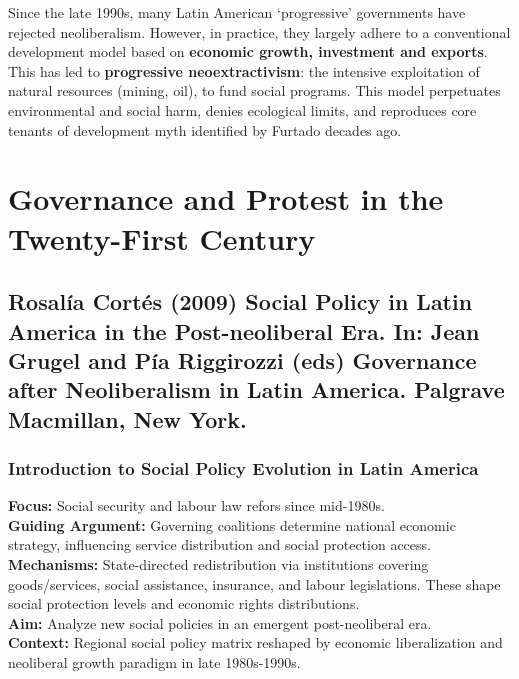 \documentclass{article}
\begin{document}
    \noindent Since the late 1990s, many Latin American `progressive'
governments have rejected neoliberalism. However, in practice, they largely
adhere to a conventional development model based on
\textbf{economic growth, investment and exports}.\\

    \noindent This has led to \textbf{progressive neoextractivism}: the
intensive exploitation of natural resources (mining, oil), to fund social
programs. This model perpetuates environmental and social harm, denies
ecological limits, and reproduces core tenants of development myth
identified by Furtado decades ago.

    \section{Governance and Protest in the Twenty-First Century}

    \subsection{Rosalía Cortés (2009) Social Policy in Latin America in the Post-neoliberal Era. In: Jean Grugel and Pía Riggirozzi (eds) Governance after Neoliberalism in Latin America. Palgrave Macmillan, New York.}
    \subsubsection{Introduction to Social Policy Evolution in Latin America}

    \noindent \textbf{Focus:} Social security and labour law refors since
mid-1980s.\\

    \noindent \textbf{Guiding Argument:} Governing coalitions determine
national economic strategy, influencing service distribution and social
protection access.\\

    \noindent \textbf{Mechanisms:} State-directed redistribution via
institutions covering goods/services, social assistance, insurance, and
labour legislations. These shape social protection levels and economic
rights distributions.\\

    \noindent \textbf{Aim:} Analyze new social policies in an emergent
post-neoliberal era.\\

    \noindent \textbf{Context:} Regional social policy matrix reshaped by
economic liberalization and neoliberal growth paradigm in late 1980s-1990s.\\
\end{document}
